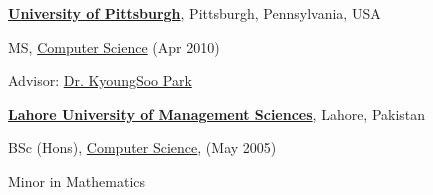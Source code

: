 \documentclass[10pt]{article}
\renewcommand{\section}[2]%
        {\pagebreak[2]\vspace{1.3\baselineskip}%
         \phantomsection\addcontentsline{toc}{section}{#1}%
         \hspace{0in}%
         \marginpar{
         \raggedright \scshape #1}#2}
\newenvironment{outerlist}[1][\enskip\textbullet]%
        {\begin{itemize}[#1]}{\end{itemize}%
         \vspace{-.6\baselineskip}}
\newenvironment{innerlist}[1][\enskip\textbullet]%
        {\begin{compactitem}[#1]}{\end{compactitem}}
\newcommand{\blankline}{\quad\pagebreak[2]}
\begin{document}
\href{http://www.pitt.edu/}{\textbf{University of Pittsburgh}},
Pittsburgh, Pennsylvania, USA
\begin{outerlist}

\item[] MS, 
        \href{http://www.cs.pitt.edu/}
             {Computer Science} 
        (Apr 2010)
        \begin{innerlist}
        \item Advisor: 
              \href{http://www.ndsl.kaist.edu/~kyoungsoo/}
                   {Dr. KyoungSoo Park} \\
        \end{innerlist}
\end{outerlist}

\href{http://www.lums.edu.pk/}{\textbf{Lahore University of Management Sciences}},
Lahore, Pakistan
\begin{outerlist}
\item[] BSc (Hons), 
        \href{http://cs.lums.edu.pk/}
             {Computer Science}, (May 2005)
        \begin{innerlist}
        \item Minor in Mathematics 
        \end{innerlist}
\end{outerlist}

%


\end{document}
